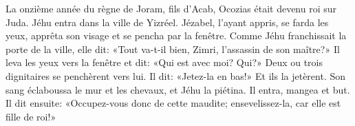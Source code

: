 La onzième année du règne de Joram, fils d’Acab,
	Ocozias était devenu roi sur Juda.
Jéhu entra dans la ville de Yizréel.
Jézabel, l’ayant appris, se farda les yeux,
	apprêta son visage et se pencha par la fenêtre.
Comme Jéhu franchissait la porte de la ville, elle dit:
	«Tout va-t-il bien, Zimri, l’assassin de son maître?»
Il leva les yeux vers la fenêtre et dit:
	«Qui est avec moi? Qui?»
Deux ou trois dignitaires se penchèrent vers lui.
Il dit: «Jetez-la en bas!» Et ils la jetèrent.
	Son sang éclaboussa le mur et les chevaux, et Jéhu la piétina.
Il entra, mangea et but.
Il dit ensuite: «Occupez-vous donc de cette maudite;
	ensevelissez-la, car elle est fille de roi!»

